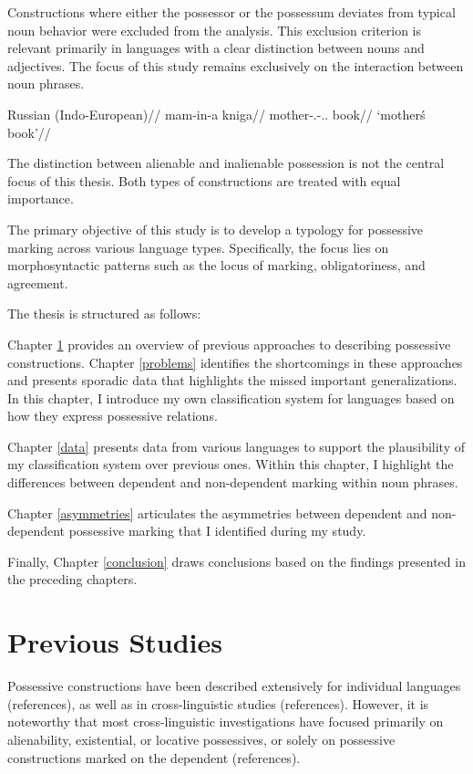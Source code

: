 Constructions where either the possessor or the possessum deviates from typical noun behavior were excluded from the analysis. This exclusion criterion is relevant primarily in languages with a clear distinction between nouns and adjectives. The focus of this study remains exclusively on the interaction between noun phrases.

\ex
\label{possessive_adjective}
\begingl
\glpreamble Russian (Indo-European)//
\gla mam-in-a kniga//
\glb mother-\Poss.\Adj-\Nom.\Sg.\F{} book//
\glft `mother\'s book'//
\endgl
\xe

The distinction between alienable and inalienable possession \citep{nichols1988alienable,alexiadou2003some} is not the central focus of this thesis. Both types of constructions are treated with equal importance.

The primary objective of this study is to develop a typology for possessive marking across various language types. Specifically, the focus lies on morphosyntactic patterns such as the locus of marking, obligatoriness, and agreement.

The thesis is structured as follows:

Chapter \ref{litreview} provides an overview of previous approaches to describing possessive constructions. Chapter \ref{problems} identifies the shortcomings in these approaches and presents sporadic data that highlights the missed important generalizations. In this chapter, I introduce my own classification system for languages based on how they express possessive relations.

Chapter \ref{data} presents data from various languages to support the plausibility of my classification system over previous ones. Within this chapter, I highlight the differences between dependent and non-dependent marking within noun phrases.

Chapter \ref{asymmetries} articulates the asymmetries between dependent and non-dependent possessive marking that I identified during my study. 

Finally, Chapter \ref{conclusion} draws conclusions based on the findings presented in the preceding chapters.

\section{Previous Studies}
\label{litreview}

Possessive constructions have been described extensively for individual languages (references), as well as in cross-linguistic studies (references). However, it is noteworthy that most cross-linguistic investigations have focused primarily on alienability, existential, or locative possessives, or solely on possessive constructions marked on the dependent (references).

